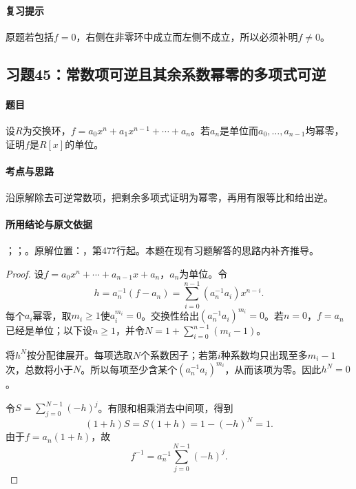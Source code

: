 \paragraph{复习提示}

原题若包括$f=0$，右侧在非零环中成立而左侧不成立，所以必须补明$f\ne0$。



\subsection{习题45：常数项可逆且其余系数幂零的多项式可逆}

\label{ex:3:45}

\paragraph{题目}

设$R$为交换环，$f=a_0x^n+a_1x^{n-1}+\cdots+a_n$。若$a_n$是单位而$a_0,\ldots,a_{n-1}$均幂零，证明$f$是$R[x]$的单位。

\paragraph{考点与思路}

沿原解除去可逆常数项，把剩余多项式证明为幂零，再用有限等比和给出逆。

\paragraph{所用结论与原文依据}

；；。原解位置：，第477行起。本题在现有习题解答的思路内补齐推导。


\begin{proof}

设$f=a_0x^n+\cdots+a_{n-1}x+a_n$，$a_n$为单位。令
\[
h=a_n^{-1}(f-a_n)=\sum_{i=0}^{n-1}(a_n^{-1}a_i)x^{n-i}.
\]
每个$a_i$幂零，取$m_i\ge1$使$a_i^{m_i}=0$。交换性给出$(a_n^{-1}a_i)^{m_i}=0$。若$n=0$，$f=a_n$已经是单位；以下设$n\ge1$，并令$N=1+\sum_{i=0}^{n-1}(m_i-1)$。

将$h^N$按分配律展开。每项选取$N$个系数因子；若第$i$种系数均只出现至多$m_i-1$次，总数将小于$N$。所以每项至少含某个$(a_n^{-1}a_i)^{m_i}$，从而该项为零。因此$h^N=0$。

令$S=\sum_{j=0}^{N-1}(-h)^j$。有限和相乘消去中间项，得到
\[
(1+h)S=S(1+h)=1-(-h)^N=1.
\]
由于$f=a_n(1+h)$，故
\[
\boxed{f^{-1}=a_n^{-1}\sum_{j=0}^{N-1}(-h)^j.}
\]

\end{proof}

